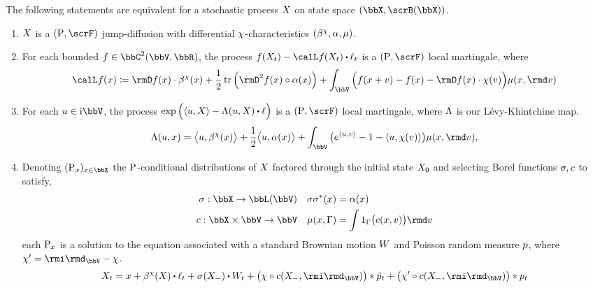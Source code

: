 \begin{theorem}
  \label{theorem:jump-diffusion-characterizations}
  The following statements are equivalent for a stochastic process $X$ on state space $(\stateSpace, \scrB(\stateSpace))$.
  \begin{enumerate}[label=(\alph*)]
    \item
      $X$ is a $(\Prb, \scrF)$ jump-diffusion with differential $\chi$-characteristics $(\beta^\chi, \alpha, \mu)$.
    \item
      For each bounded $f \in \ccpathSpace{2}{\vecSpace}{\bbR}$, the process $f(\X_t) - \generator f(\X_t) \shortInt \leb_t$ is a $(\Prb, \scrF)$ local martingale, where
      \[
        \generator f(\stateVar) \defeq \Der f(\stateVar) \cdot \affDrift^\trunc(\stateVar) + \frac12 \tr\Big( \Hess f(\stateVar) \circ \affDiff(\stateVar) \Big) + \int_\vecSpace \Big( f(\stateVar + \markVar) - f(\stateVar) - \Der f(\stateVar) \cdot \trunc(\markVar) \Big) \affJump(\stateVar, \rmd\markVar)
      \]
    \item
      For each $\momentVar \in \im\vecSpace$, the process $\exp\Big(\prj{\momentVar}{\X} - \ode(\momentVar, \X) \shortInt \leb \Big)$ is a $(\Prb, \scrF)$ local martingale, where $\Lambda$ is our L\'evy-Khintchine map.
      \[
        \ode(\momentVar, \stateVar) = \bprj{\momentVar}{\affDrift^\trunc(\stateVar)} + \frac12\bprj{\momentVar}{\affDiff(\stateVar)} + \int_\vecSpace \big( e^\prj{\momentVar}{\markVar} - 1 - \prj{\momentVar}{\trunc(\markVar)} \big) \affJump(\stateVar, \rmd\markVar),
      \]
    \item
      Denoting $(\Prb_\stateVar)_{\stateVar\in\stateSpace}$ the ${\operatorname{P}}$-conditional distributions of $X$ factored through the initial state $X_0$ and selecting Borel functions $\sigma, c$ to satisfy,
      \begin{equation*}
        \label{eq:sde-terms}
        \begin{aligned}
          \affDiffSqrt: \stateSpace \rightarrow \bbL(\vecSpace) && \affDiffSqrt\affDiffSqrt^*(\stateVar) &= \affDiff(\stateVar) \\
          \thinner: \stateSpace \times \vecSpace \rightarrow \vecSpace && \affJump(\stateVar, \Gamma) &= \int 1_\Gamma\big( \thinner(\stateVar, \markVar) \big) \rmd\markVar
        \end{aligned}
      \end{equation*}
      each ${\operatorname{P}}_x$ is a solution to the equation associated with a standard Brownian motion $W$ and Poisson random measure $p$, where $\trunc' = \id_\vecSpace - \trunc$.
      \begin{equation*}
        \X_t = \stateVar + \affDrift^\trunc(\X) \shortInt \leb_t + \sigma(\X_-) \shortInt \W_t + \big( \trunc \circ \thinner(\X_-, \id_\vecSpace) \big) \ast \compensate{\poisRM}_t + \big( \trunc' \circ \thinner(\X_-, \id_\vecSpace) \big) \ast \poisRM_t
      \end{equation*}
  \end{enumerate}
\end{theorem}
